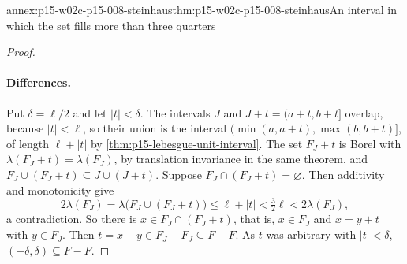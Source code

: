 \begin{annexitem}{annex:p15-w02c-p15-008-steinhaus}{thm:p15-w02c-p15-008-steinhaus}{An interval in which the set fills more than three quarters}
\begin{proof}
\paragraph{Differences.}
Put \(\delta=\ell/2\) and let \(|t|<\delta\). The intervals \(J\) and
\(J+t=(a+t,b+t]\) overlap, because \(|t|<\ell\), so their union is the
interval \((\min(a,a+t),\max(b,b+t)]\), of length \(\ell+|t|\) by
\cref{thm:p15-lebesgue-unit-interval}. The set \(F_J+t\) is Borel with
\(\lambda(F_J+t)=\lambda(F_J)\), by translation invariance in the same theorem,
and \(F_J\cup(F_J+t)\subseteq J\cup(J+t)\).
Suppose \(F_J\cap(F_J+t)=\varnothing\). Then additivity and monotonicity give
\[
 2\lambda(F_J)=\lambda\bigl(F_J\cup(F_J+t)\bigr)\leq\ell+|t|<\tfrac32\ell
           <2\lambda(F_J),
\]
a contradiction. So there is \(x\in F_J\cap(F_J+t)\), that is, \(x\in F_J\)
and \(x=y+t\) with \(y\in F_J\). Then \(t=x-y\in F_J-F_J\subseteq F-F\). As
\(t\) was arbitrary with \(|t|<\delta\), \((-\delta,\delta)\subseteq F-F\).
\end{proof}
\end{annexitem}

